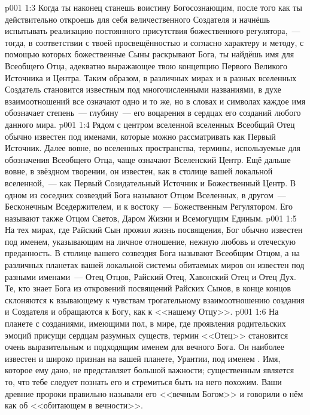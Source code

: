 \vs p001 1:3 Когда ты наконец станешь воистину Богосознающим, после того как ты действительно откроешь для себя величественного Создателя и начнёшь испытывать реализацию постоянного присутствия божественного регулятора,~--- тогда, в соответствии с твоей просвещённостью и согласно характеру и методу, с помощью которых божественные Сыны раскрывают Бога, ты найдёшь имя для Всеобщего Отца, адекватно выражающее твою концепцию Первого Великого Источника и Центра. Таким образом, в различных мирах и в разных вселенных Создатель становится известным под многочисленными названиями, в духе взаимоотношений все означают одно и то же, но в словах и символах каждое имя обозначает степень~--- глубину~--- его воцарения в сердцах его созданий любого данного мира.
\vs p001 1:4 \pc Рядом с центром вселенной вселенных Всеобщий Отец обычно известен под именами, которые можно рассматривать как Первый Источник. Далее вовне, во вселенных пространства, термины, используемые для обозначения Всеобщего Отца, чаще означают Вселенский Центр. Ещё дальше вовне, в звёздном творении, он известен, как в столице вашей локальной вселенной,~--- как Первый Созидательный Источник и Божественный Центр. В одном из соседних созвездий Бога называют Отцом Вселенных, в другом~--- Бесконечным Вседержителем, и к востоку~--- Божественным Регулятором. Его называют также Отцом Светов, Даром Жизни и Всемогущим Единым.
\vs p001 1:5 На тех мирах, где Райский Сын прожил жизнь посвящения, Бог обычно известен под именем, указывающим на личное отношение, нежную любовь и отеческую преданность. В столице вашего созвездия Бога называют Всеобщим Отцом, а на различных планетах вашей локальной системы обитаемых миров он известен под разными именами~--- Отец Отцов, Райский Отец, Хавонский Отец и Отец Дух. Те, кто знает Бога из откровений посвящений Райских Сынов, в конце концов склоняются к взывающему к чувствам трогательному взаимоотношению создания и Создателя и обращаются к Богу, как к <<нашему Отцу>>.
\vs p001 1:6 На планете с созданиями, имеющими пол, в мире, где проявления родительских эмоций присущи сердцам разумных существ, термин <<Отец>> становится очень выразительным и подходящим именем для вечного Бога. Он наиболее известен и широко признан на вашей планете, Урантии, под именем . Имя, которое ему дано, не представляет большой важности; существенным является то, что тебе следует познать его и стремиться быть на него похожим. Ваши древние пророки правильно называли его <<вечным Богом>> и говорили о нём как об <<обитающем в вечности>>.
